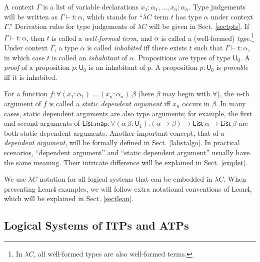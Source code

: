   A context $\Gamma$ is a list of variable declarations $x_1 : \alpha_1, \dots, x_n : \alpha_n$.
  Type judgements will be written as $\Gamma \vdash t : \alpha$, which stands for ``$\lambda C$ term $t$
  has type $\alpha$ under context $\Gamma$.'' Derivation rules for type judgements of
  $\lambda C$ will be given in Sect. \ref{sectpts}. If $\Gamma \vdash t : \alpha$, then $t$ is
  called a \textit{well-formed term}, and $\alpha$ is called a (well-formed)
  \textit{type}.\footnote{In $\lambda C$, all well-formed types are also well-formed terms.}
  Under context $\Gamma$, a type $\alpha$ is called \textit{inhabited} iff there exists $t$ such
  that $\Gamma \vdash t : \alpha$, in which case $t$ is called an \textit{inhabitant} of $\alpha$.
  Propositions are types of type $\mathsf{U}_0$. A \textit{proof} of a proposition
  $p : \mathsf{U}_0$ is an inhabitant of $p$. A proposition $p : \mathsf{U}_0$ is \textit{provable}
  iff it is inhabited.

  For a function $f : \forall (x_1 : \alpha_1) \ \dots \ (x_n : \alpha_n). \beta$ (here $\beta$ may begin with $\forall$),
  the $n$-th argument of $f$ is called a \textit{static dependent argument} iff $x_n$ occurs in $\beta$.
  In many cases, static dependent arguments are also type arguments; for example, the first and second arguments
  of $\mathsf{List.map} : \forall (\alpha \ \beta : \mathsf{U}_1). (\alpha \to
  \beta) \to \mathsf{List} \ \alpha \to \mathsf{List} \ \beta$ are both static
  dependent arguments.
  Another important concept, that of a \textit{dependent argument}, will be formally defined in
  Sect. \ref{labstalgo}. In practical scenarios, ``dependent argument'' and ``static dependent argument'' usually
  have the same meaning. Their intricate difference will be explained in Sect. \ref{exqdet}.

  We use $\lambda C$ notation for all logical systems that can be embedded in $\lambda C$.
  When presenting Lean4 examples, we will follow extra notational conventions
  of Lean4, which will be explained in Sect. \ref{sectlean}.

\subsection{Logical Systems of ITPs and ATPs}\label{sublogsys}

